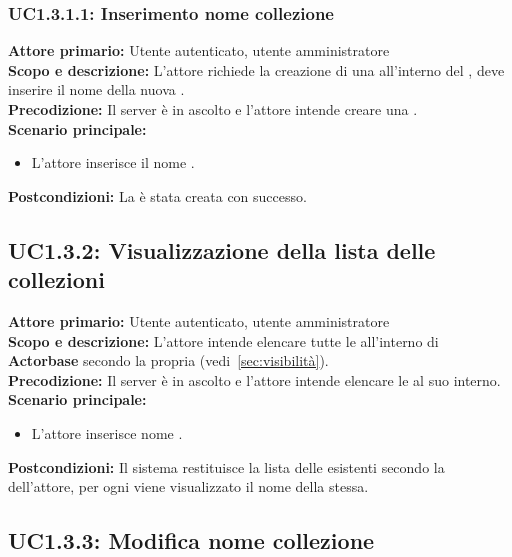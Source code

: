 \documentclass{scalatekids-article}
\begin{document}
\subsubsection{UC1.3.1.1: Inserimento nome collezione}

\textbf{Attore primario:} Utente autenticato, utente amministratore\\
\textbf{Scopo e descrizione:} L'attore richiede la creazione di una  all'interno del , deve inserire il nome della nuova .\\
\textbf{Precodizione:} Il server è in ascolto e l'attore intende creare una .\\
\textbf{Scenario principale:}
\begin{itemize}
\item L'attore inserisce il nome .
\end{itemize}
\textbf{Postcondizioni:} La  è stata creata con successo.

\subsection{UC1.3.2: Visualizzazione della lista delle collezioni}

\textbf{Attore primario:} Utente autenticato, utente amministratore\\
\textbf{Scopo e descrizione:} L'attore intende elencare tutte le  all'interno di \textbf{Actorbase} secondo la propria  (vedi~\ref{sec:visibilità}).\\
\textbf{Precodizione:} Il server è in ascolto e l'attore intende elencare le  al suo interno.\\
\textbf{Scenario principale:}
\begin{itemize}
\item L'attore inserisce nome .
\end{itemize}
\textbf{Postcondizioni:} Il sistema restituisce la lista delle  esistenti secondo la  dell'attore, per ogni  viene visualizzato il nome della  stessa.

\subsection{UC1.3.3: Modifica nome collezione}
\end{document}
